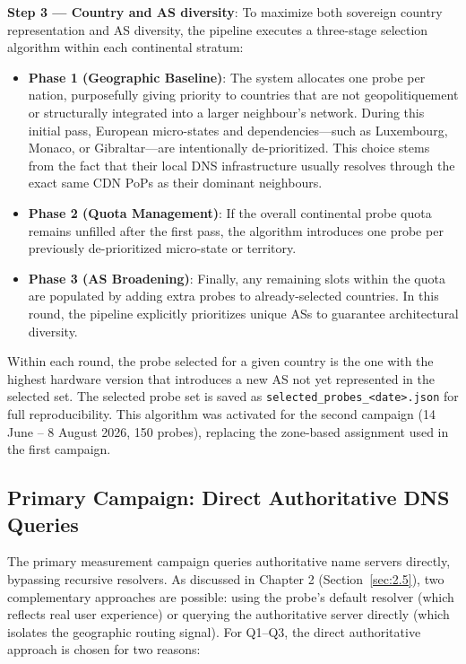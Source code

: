 \textbf{Step 3 --- Country and \ac{AS} diversity}: To maximize both sovereign country representation and \ac{AS} diversity, the pipeline executes a three-stage selection algorithm within each continental stratum:

\begin{itemize}
  \item \textbf{Phase 1 (Geographic Baseline)}: The system allocates one probe per nation, purposefully giving priority to countries that are not geopolitiquement or structurally integrated into a larger neighbour's network. During this initial pass, European micro-states and dependencies—such as Luxembourg, Monaco, or Gibraltar—are intentionally de-prioritized. This choice stems from the fact that their local \ac{DNS} infrastructure usually resolves through the exact same \ac{CDN} \ac{PoPs} as their dominant neighbours.
  \item \textbf{Phase 2 (Quota Management)}: If the overall continental probe quota remains unfilled after the first pass, the algorithm introduces one probe per previously de-prioritized micro-state or territory.
  \item \textbf{Phase 3 (\ac{AS} Broadening)}: Finally, any remaining slots within the quota are populated by adding extra probes to already-selected countries. In this round, the pipeline explicitly prioritizes unique \ac{AS}s to guarantee architectural diversity.
\end{itemize}

Within each round, the probe selected for a given country is the one with the highest hardware version that introduces a new \ac{AS} not yet represented in the selected set. The selected probe set is saved as \texttt{selected\_probes\_<date>.json} for full reproducibility. This algorithm was activated for the second campaign (14 June -- 8 August 2026, 150 probes), replacing the zone-based assignment used in the first campaign.

\subsection{Primary Campaign: Direct Authoritative DNS Queries}
\label{subsec:3.3.2}

The primary measurement campaign queries authoritative name servers directly, bypassing recursive resolvers. As discussed in Chapter 2 (Section~\ref{sec:2.5}), two complementary approaches are possible: using the probe's default resolver (which reflects real user experience) or querying the authoritative server directly (which isolates the geographic routing signal). For Q1--Q3, the direct authoritative approach is chosen for two reasons:

